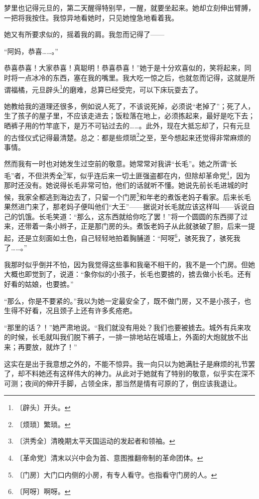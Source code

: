 \documentclass[12pt,UTF-8,openany]{ctexbook}
\begin{document}
\begin{large}
    梦里也记得元旦的，第二天醒得特别早，一醒，就要坐起来。她却立刻伸出臂膊，一把将我按住。我惊异地看她时，只见她惶急地看着我。
    
    她又有所要求似的，摇着我的肩。我忽而记得了——
    
    “阿妈，恭喜……。”
    
    恭喜恭喜！大家恭喜！真聪明！恭喜恭喜！”她于是十分欢喜似的，笑将起来，同时将一点冰冷的东西，塞在我的嘴里。我大吃一惊之后，也就忽而记得，这就是所谓福橘，元旦辟头\footnote{〔辟头〕开头。}的磨难，总算已经受完，可以下床玩耍去了。
    
    她教给我的道理还很多，例如说人死了，不该说死掉，必须说“老掉了”；死了人，生了孩子的屋子里，不应该走进去；饭粒落在地上，必须拣起来，最好是吃下去；晒裤子用的竹竿底下，是万不可钻过去的……。此外，现在大抵忘却了，只有元旦的古怪仪式记得最清楚。总之：都是些烦琐\footnote{〔烦琐〕繁琐。}之至，至今想起来还觉得非常麻烦的事情。
    
    然而我有一时也对她发生过空前的敬意。她常常对我讲“长毛”。她之所谓“长毛”者，不但洪秀全\footnote{〔洪秀全〕清晚期太平天国运动的发起者和领袖。}军，似乎连后来一切土匪强盗都在内，但除却革命党\footnote{〔革命党〕清末以兴中会为首、意图推翻帝制的革命团体。}，因为那时还没有。她说得长毛非常可怕，他们的话就听不懂。她说先前长毛进城的时候，我家全都逃到海边去了，只留一个门房\footnote{〔门房〕大门口内侧的小房，有专人看守。也指看守门房的人。}和年老的煮饭老妈子看家。后来长毛果然进门来了，那老妈子便叫他们“大王”——据说对长毛就应该这样叫——诉说自己的饥饿。长毛笑道：“那么，这东西就给你吃了罢！”将一个圆圆的东西掷了过来，还带着一条小辫子，正是那门房的头。煮饭老妈子从此就骇破了胆，后来一提起，还是立刻面如土色，自己轻轻地拍着胸脯道：“阿呀\footnote{〔阿呀〕啊呀。}，骇死我了，骇死我了……。”
    
    我那时似乎倒并不怕，因为我觉得这些事和我毫不相干的，我不是一个门房。但她大概也即觉到了，说道：“象你似的小孩子，长毛也要掳的，掳去做小长毛。还有好看的姑娘，也要掳。”
    
    “那么，你是不要紧的。”我以为她一定最安全了，既不做门房，又不是小孩子，也生得不好看，况且颈子上还有许多炙疮疤。
    
    “那里的话？！”她严肃地说。“我们就没有用处？我们也要被掳去。城外有兵来攻的时候，长毛就叫我们脱下裤子，一排一排地站在城墙上，外面的大炮就放不出来；再要放，就炸了！”
    
    这实在是出于我意想之外的，不能不惊异。我一向只以为她满肚子是麻烦的礼节罢了，却不料她还有这样伟大的神力。从此对于她就有了特别的敬意，似乎实在深不可测；夜间的伸开手脚，占领全床，那当然是情有可原的了，倒应该我退让。
    

\end{large}
\end{document}
